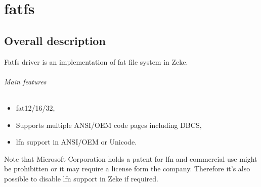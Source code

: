 \chapter{fatfs}

\section{Overall description}

Fatfs driver is an implementation of \acf{fat} file system in Zeke.

\subparagraph{Main features}
\begin{itemize}
    \item \acs{fat}12/16/32,
    \item Supports multiple ANSI/OEM code pages including DBCS,
    \item \acf{lfn} support in ANSI/OEM or Unicode.
\end{itemize}

Note that Microsoft Corporation holds a patent for \ac{lfn} and commercial
use might be prohibitten or it may require a license form the company.
Therefore it's also possible to disable \acs{lfn} support in Zeke if required.
